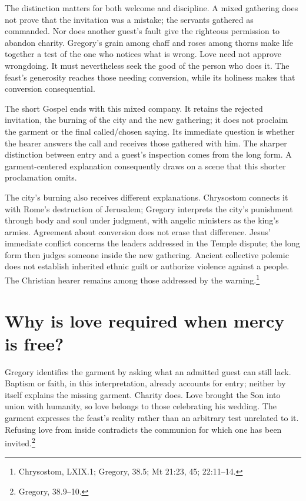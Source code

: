 The distinction matters for both welcome and discipline. A mixed gathering does not prove that the invitation was a mistake; the servants gathered as commanded. Nor does another guest's fault give the righteous permission to abandon charity. Gregory's grain among chaff and roses among thorns make life together a test of the one who notices what is wrong. Love need not approve wrongdoing. It must nevertheless seek the good of the person who does it. The feast's generosity reaches those needing conversion, while its holiness makes that conversion consequential.

The short Gospel ends with this mixed company. It retains the rejected invitation, the burning of the city and the new gathering; it does not proclaim the garment or the final called/chosen saying. Its immediate question is whether the hearer answers the call and receives those gathered with him. The sharper distinction between entry and a guest's inspection comes from the long form. A garment-centered explanation consequently draws on a scene that this shorter proclamation omits.

The city's burning also receives different explanations. Chrysostom connects it with Rome's destruction of Jerusalem; Gregory interprets the city's punishment through body and soul under judgment, with angelic ministers as the king's armies. Agreement about conversion does not erase that difference. Jesus' immediate conflict concerns the leaders addressed in the Temple dispute; the long form then judges someone inside the new gathering. Ancient collective polemic does not establish inherited ethnic guilt or authorize violence against a people. The Christian hearer remains among those addressed by the warning.\footnote{Chrysostom,  LXIX.1; Gregory,  38.5; Mt 21:23, 45; 22:11--14.}

\section{Why is love required when mercy is free?}
Gregory identifies the garment by asking what an admitted guest can still lack. Baptism or faith, in this interpretation, already accounts for entry; neither by itself explains the missing garment. Charity does. Love brought the Son into union with humanity, so love belongs to those celebrating his wedding. The garment expresses the feast's reality rather than an arbitrary test unrelated to it. Refusing love from inside contradicts the communion for which one has been invited.\footnote{Gregory,  38.9--10.}

